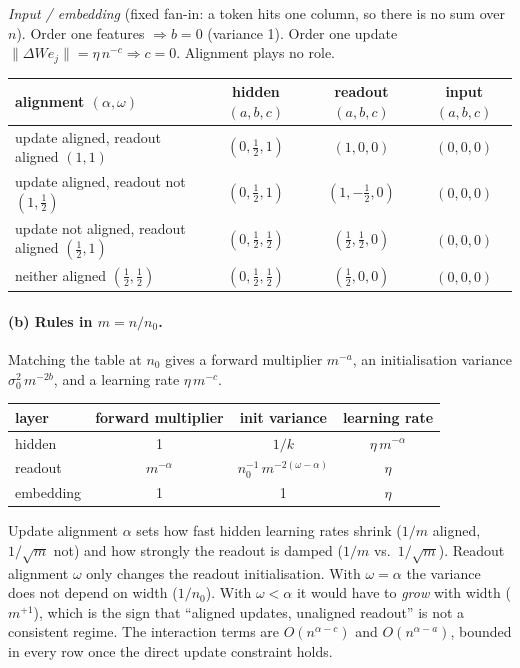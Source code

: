 \documentclass[10pt,letterpaper]{article}
\begin{document}
\emph{Input / embedding} (fixed fan-in: a token hits one column, so there is no sum over $n$). Order one features $\Rightarrow b=0$ (variance 1). Order one update $\lVert\Delta W e_j\rVert=\eta\,n^{-c}\Rightarrow c=0$. Alignment plays no role.

\begin{table}[H]\centering\small
\begin{tabular}{lccc}\toprule
alignment $(\alpha,\omega)$ & hidden $(a,b,c)$ & readout $(a,b,c)$ & input $(a,b,c)$\\\midrule
update aligned, readout aligned $(1,1)$ & $(0,\tfrac12,1)$ & $(1,0,0)$ & $(0,0,0)$\\
update aligned, readout not $(1,\tfrac12)$ & $(0,\tfrac12,1)$ & $(1,-\tfrac12,0)$ & $(0,0,0)$\\
update not aligned, readout aligned $(\tfrac12,1)$ & $(0,\tfrac12,\tfrac12)$ & $(\tfrac12,\tfrac12,0)$ & $(0,0,0)$\\
neither aligned $(\tfrac12,\tfrac12)$ & $(0,\tfrac12,\tfrac12)$ & $(\tfrac12,0,0)$ & $(0,0,0)$\\\bottomrule
\end{tabular}
\end{table}

\paragraph{(b) Rules in $m=n/n_0$.} Matching the table at $n_0$ gives a forward multiplier $m^{-a}$, an initialisation variance $\sigma_0^2\,m^{-2b}$, and a learning rate $\eta\,m^{-c}$.

\begin{table}[H]\centering\small
\begin{tabular}{lccc}\toprule
layer & forward multiplier & init variance & learning rate\\\midrule
hidden & 1 & $1/k$ & $\eta\,m^{-\alpha}$\\
readout & $m^{-\alpha}$ & $n_0^{-1}\,m^{-2(\omega-\alpha)}$ & $\eta$\\
embedding & 1 & 1 & $\eta$\\\bottomrule
\end{tabular}
\end{table}

Update alignment $\alpha$ sets how fast hidden learning rates shrink ($1/m$ aligned, $1/\sqrt m$ not) and how strongly the readout is damped ($1/m$ vs.\ $1/\sqrt m$). Readout alignment $\omega$ only changes the readout initialisation. With $\omega=\alpha$ the variance does not depend on width ($1/n_0$). With $\omega<\alpha$ it would have to \emph{grow} with width ($m^{+1}$), which is the sign that ``aligned updates, unaligned readout'' is not a consistent regime. The interaction terms are $O(n^{\alpha-c})$ and $O(n^{\alpha-a})$, bounded in every row once the direct update constraint holds.
\end{document}
